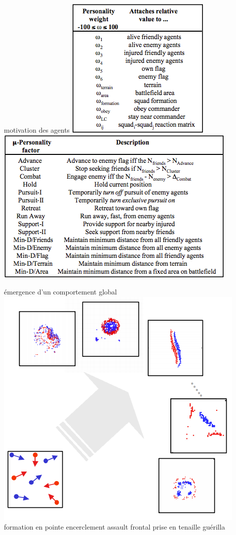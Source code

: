 \documentclass{article}
\begin{document}
motivation des agents
\includegraphics[]{../ressources/einstein_personality_weight}
\includegraphics[]{../ressources/einstein_personality_factor}

émergence d'un comportement global
\includegraphics[]{../ressources/einstein_global_behavior}
formation en pointe
encerclement
assault frontal
prise en tenaille
guérilla
\end{document}
